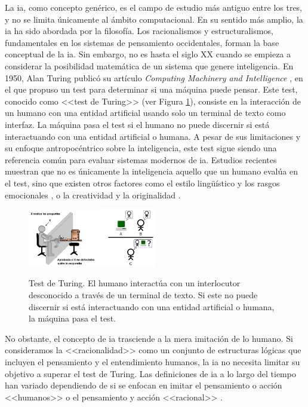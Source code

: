 La \gls{ia}, como concepto genérico, es el campo de estudio más antiguo entre los tres, y no se limita únicamente al ámbito computacional. En su sentido más amplio, la \gls{ia} ha sido abordada por la filosofía. Los racionalismos y estructuralismos, fundamentales en los sistemas de pensamiento occidentales, forman la base conceptual de la \gls{ia}. Sin embargo, no es hasta el siglo XX cuando se empieza a considerar la posibilidad matemática de un sistema que genere inteligencia. En 1950, Alan Turing publicó su artículo \emph{Computing Machinery and Intelligence} \citep{alan1950a}, en el que propuso un test para determinar si una máquina puede pensar. Este test, conocido como <<test de Turing>> (ver Figura \ref{fig:test_turing}), consiste en la interacción de un humano con una entidad artificial usando solo un terminal de texto como interfaz. La máquina pasa el test si el humano no puede discernir si está interactuando con una entidad artificial o humana. A pesar de sus limitaciones y su enfoque antropocéntrico sobre la inteligencia, este test sigue siendo una referencia común para evaluar sistemas modernos de \gls{ia}. Estudios recientes muestran que no es únicamente la inteligencia aquello que un humano evalúa en el test, sino que existen otros factores como el estilo lingüístico y los rasgos emocionales \citep{jonesDoesGPT4Pass2023}, o la creatividad y la originalidad \citep{noeverTuringDeception2022}.

\begin{figure}[H]
    \caption[Test de Turing]{Test de Turing. El humano interactúa con un interlocutor desconocido a través de un terminal de texto. Si este no puede discernir si está interactuando con una entidad artificial o humana, la máquina pasa el test.}
    \centering
    \includegraphics[width=0.5\textwidth]{./figuras/test_turing.png}
    \label{fig:test_turing}
\end{figure}

No obstante, el concepto de \gls{ia} trasciende a la mera imitación de lo humano. Si consideramos la <<racionalidad>> como un conjunto de estructuras lógicas que incluyen el pensamiento y el entendimiento humanos, la \gls{ia} no necesita limitar su objetivo a superar el test de Turing. Las definiciones de \gls{ia} a lo largo del tiempo han variado dependiendo de si se enfocan en imitar el pensamiento o acción <<humanos>> o el pensamiento y acción <<racional>> \citep{RussellStuartJ2021AI:A}.

